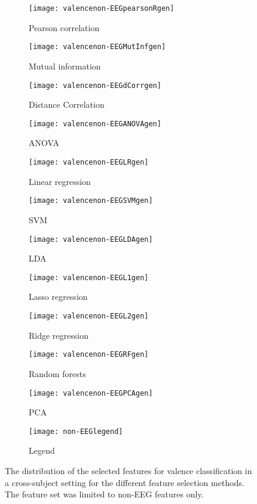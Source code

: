 \clearpage

\begin{figure}[!tbp]
  \centering
  \begin{subfigure}[b]{0.3\textwidth}
    \texttt{[image: valencenon-EEGpearsonRgen]}
    \caption{Pearson correlation}
  \end{subfigure}
  \hfill
  \begin{subfigure}[b]{0.3\textwidth}
    \texttt{[image: valencenon-EEGMutInfgen]}
    \caption{Mutual information}
  \end{subfigure}
  \hfill
  \begin{subfigure}[b]{0.3\textwidth}
    \texttt{[image: valencenon-EEGdCorrgen]}
    \caption{Distance Correlation}
  \end{subfigure}
  
  \begin{subfigure}[b]{0.3\textwidth}
    \texttt{[image: valencenon-EEGANOVAgen]}
    \caption{ANOVA}
  \end{subfigure}
  \hfill
  \begin{subfigure}[b]{0.3\textwidth}
    \texttt{[image: valencenon-EEGLRgen]}
    \caption{Linear regression}
  \end{subfigure}
  \hfill
  \begin{subfigure}[b]{0.3\textwidth}
    \texttt{[image: valencenon-EEGSVMgen]}
    \caption{SVM}
  \end{subfigure}
  
  \begin{subfigure}[b]{0.3\textwidth}
    \texttt{[image: valencenon-EEGLDAgen]}
    \caption{LDA}
  \end{subfigure}
  \hfill
  \begin{subfigure}[b]{0.3\textwidth}
    \texttt{[image: valencenon-EEGL1gen]}
    \caption{Lasso regression}
  \end{subfigure}
  \hfill
  \begin{subfigure}[b]{0.3\textwidth}
    \texttt{[image: valencenon-EEGL2gen]}
    \caption{Ridge regression}
  \end{subfigure}
  
  \begin{subfigure}[b]{0.3\textwidth}
    \texttt{[image: valencenon-EEGRFgen]}
    \caption{Random forests}
  \end{subfigure}
  \hfill
  \begin{subfigure}[b]{0.3\textwidth}
    \texttt{[image: valencenon-EEGPCAgen]}
    \caption{PCA}
  \end{subfigure}
  \hfill
  \begin{subfigure}[b]{0.3\textwidth}
    \texttt{[image: non-EEGlegend]}
    \caption{Legend\label{valencepiesnon-EEGlegendgen}}
  \end{subfigure}
  \caption{The distribution of the selected features for valence classification in a cross-subject setting for the different feature selection methods. The feature set was limited to non-EEG features only. \label{valencenon-EEGpiesgen}}
\end{figure}
\clearpage

